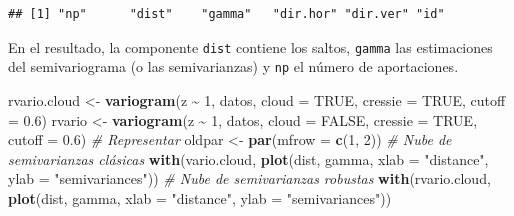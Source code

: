 \documentclass[
]{book}
\newenvironment{Shaded}{\begin{snugshade}}{\end{snugshade}}
\newcommand{\AttributeTok}[1]{\textcolor[rgb]{0.13,0.29,0.53}{#1}}
\newcommand{\CommentTok}[1]{\textcolor[rgb]{0.56,0.35,0.01}{\textit{#1}}}
\newcommand{\ConstantTok}[1]{\textcolor[rgb]{0.56,0.35,0.01}{#1}}
\newcommand{\DecValTok}[1]{\textcolor[rgb]{0.00,0.00,0.81}{#1}}
\newcommand{\FloatTok}[1]{\textcolor[rgb]{0.00,0.00,0.81}{#1}}
\newcommand{\FunctionTok}[1]{\textcolor[rgb]{0.13,0.29,0.53}{\textbf{#1}}}
\newcommand{\NormalTok}[1]{#1}
\newcommand{\OtherTok}[1]{\textcolor[rgb]{0.56,0.35,0.01}{#1}}
\newcommand{\SpecialCharTok}[1]{\textcolor[rgb]{0.81,0.36,0.00}{\textbf{#1}}}
\newcommand{\StringTok}[1]{\textcolor[rgb]{0.31,0.60,0.02}{#1}}
\theoremstyle{break}
\theoremstyle{definition}
\theoremstyle{definition}
\theoremstyle{definition}
\theoremstyle{definition}
\theoremstyle{remark}
\begin{document}
\begin{Shaded}
\end{Shaded}

\begin{verbatim}
## [1] "np"      "dist"    "gamma"   "dir.hor" "dir.ver" "id"
\end{verbatim}

En el resultado, la componente \texttt{dist} contiene los saltos, \texttt{gamma} las estimaciones del semivariograma (o las semivarianzas) y \texttt{np} el número de aportaciones.

\begin{Shaded}
\begin{Highlighting}[]
\NormalTok{rvario.cloud }\OtherTok{\textless{}{-}} \FunctionTok{variogram}\NormalTok{(z }\SpecialCharTok{\textasciitilde{}} \DecValTok{1}\NormalTok{, datos, }\AttributeTok{cloud =} \ConstantTok{TRUE}\NormalTok{, }\AttributeTok{cressie =} \ConstantTok{TRUE}\NormalTok{, }\AttributeTok{cutoff =} \FloatTok{0.6}\NormalTok{)}
\NormalTok{rvario }\OtherTok{\textless{}{-}} \FunctionTok{variogram}\NormalTok{(z }\SpecialCharTok{\textasciitilde{}} \DecValTok{1}\NormalTok{, datos, }\AttributeTok{cloud =} \ConstantTok{FALSE}\NormalTok{, }\AttributeTok{cressie =} \ConstantTok{TRUE}\NormalTok{, }\AttributeTok{cutoff =} \FloatTok{0.6}\NormalTok{)}
\CommentTok{\# Representar}
\NormalTok{oldpar }\OtherTok{\textless{}{-}} \FunctionTok{par}\NormalTok{(}\AttributeTok{mfrow =} \FunctionTok{c}\NormalTok{(}\DecValTok{1}\NormalTok{, }\DecValTok{2}\NormalTok{))}
\CommentTok{\# Nube de semivarianzas clásicas}
\FunctionTok{with}\NormalTok{(vario.cloud,  }\FunctionTok{plot}\NormalTok{(dist, gamma, }\AttributeTok{xlab =} \StringTok{"distance"}\NormalTok{, }\AttributeTok{ylab =} \StringTok{"semivariances"}\NormalTok{))}
\CommentTok{\# Nube de semivarianzas robustas}
\FunctionTok{with}\NormalTok{(rvario.cloud,  }\FunctionTok{plot}\NormalTok{(dist, gamma, }\AttributeTok{xlab =} \StringTok{"distance"}\NormalTok{, }\AttributeTok{ylab =} \StringTok{"semivariances"}\NormalTok{))}
\end{Highlighting}
\end{Shaded}
\end{document}
